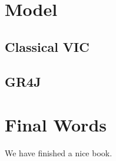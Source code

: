 \documentclass[
]{book}
\begin{document}
\hypertarget{model}{%
\chapter{Model}\label{model}}

\hypertarget{classical-vic}{%
\section{Classical VIC}\label{classical-vic}}

\hypertarget{gr4j}{%
\section{GR4J}\label{gr4j}}

\hypertarget{final-words}{%
\chapter{Final Words}\label{final-words}}

We have finished a nice book.

  
\end{document}
